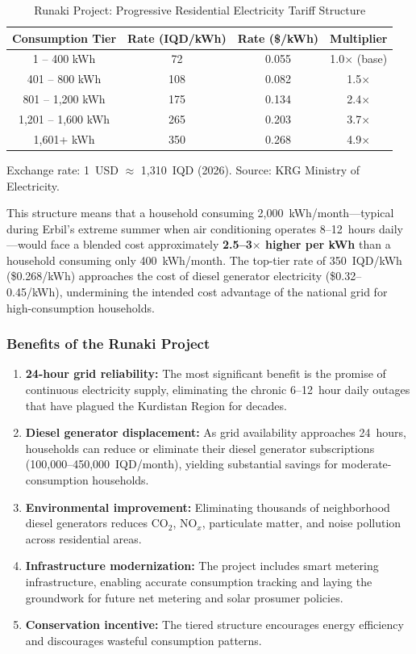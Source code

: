 \begin{table}[H]
\centering
\caption{Runaki Project: Progressive Residential Electricity Tariff Structure}
\label{tab:runaki_tariff}
\begin{tabular}{@{}c c c c@{}}
\toprule
\textbf{Consumption Tier} & \textbf{Rate (IQD/kWh)} & \textbf{Rate (\$/kWh)} & \textbf{Multiplier} \\
\midrule
1 -- 400 kWh & 72 & 0.055 & 1.0$\times$ (base) \\
401 -- 800 kWh & 108 & 0.082 & 1.5$\times$ \\
801 -- 1,200 kWh & 175 & 0.134 & 2.4$\times$ \\
1,201 -- 1,600 kWh & 265 & 0.203 & 3.7$\times$ \\
1,601+ kWh & 350 & 0.268 & 4.9$\times$ \\
\bottomrule
\end{tabular}
\begin{flushleft}
\small Exchange rate: 1~USD $\approx$ 1,310~IQD (2026). Source: KRG Ministry of Electricity.
\end{flushleft}
\end{table}

This structure means that a household consuming 2,000~kWh/month---typical during Erbil's extreme summer when air conditioning operates 8--12~hours daily---would face a blended cost approximately \textbf{2.5--3$\times$ higher per kWh} than a household consuming only 400~kWh/month. The top-tier rate of 350~IQD/kWh (\$0.268/kWh) approaches the cost of diesel generator electricity (\$0.32--0.45/kWh), undermining the intended cost advantage of the national grid for high-consumption households.

\subsubsection{Benefits of the Runaki Project}

\begin{enumerate}
    \item \textbf{24-hour grid reliability:} The most significant benefit is the promise of continuous electricity supply, eliminating the chronic 6--12~hour daily outages that have plagued the Kurdistan Region for decades.
    \item \textbf{Diesel generator displacement:} As grid availability approaches 24~hours, households can reduce or eliminate their diesel generator subscriptions (100,000--450,000~IQD/month), yielding substantial savings for moderate-consumption households.
    \item \textbf{Environmental improvement:} Eliminating thousands of neighborhood diesel generators reduces CO$_2$, NO$_x$, particulate matter, and noise pollution across residential areas.
    \item \textbf{Infrastructure modernization:} The project includes smart metering infrastructure, enabling accurate consumption tracking and laying the groundwork for future net metering and solar prosumer policies.
    \item \textbf{Conservation incentive:} The tiered structure encourages energy efficiency and discourages wasteful consumption patterns.
\end{enumerate}

